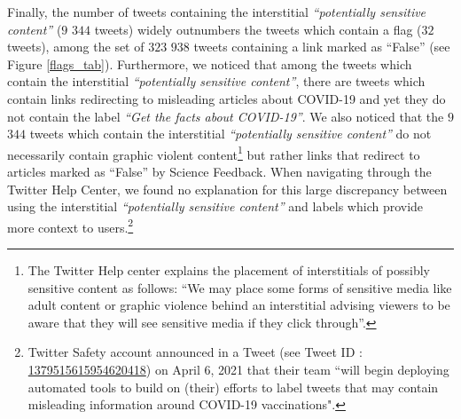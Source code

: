 \documentclass{article}
\begin{document}
Finally, the number of tweets containing the interstitial {\it ``potentially sensitive content''} ($9$ $344$ tweets) widely outnumbers the tweets which contain a flag ($32$ tweets), among the set of $323$ $938$ tweets containing a link marked as ``False'' (see Figure \ref{flags_tab}). Furthermore, we noticed that among the tweets which contain the interstitial {\it ``potentially sensitive content''}, there are tweets which contain links redirecting to misleading articles about COVID-19 and yet they do not contain the label { \it ``Get the facts about COVID-19''}. We also noticed that the $9$ $344$ tweets which contain the interstitial {\it ``potentially sensitive content''} do not necessarily contain graphic violent content\footnote{The Twitter Help center explains the placement of interstitials of possibly sensitive content as follows: ``We may place some forms of sensitive media like adult content or graphic violence behind an interstitial advising viewers to be aware that they will see sensitive media if they click through''.} but rather links that redirect to articles marked as ``False'' by Science Feedback. When navigating through the Twitter Help Center, we found no explanation for this large discrepancy between using the interstitial {\it ``potentially sensitive content''} and labels which provide more context to users.\footnote{Twitter Safety account announced in a Tweet (see Tweet ID : \href{https://twitter.com/TwitterSafety/status/1379515615954620418}{1379515615954620418}) on April 6, 2021 that their team ``will begin deploying automated tools to build on (their) efforts to label tweets that may contain misleading information around COVID-19 vaccinations".}  
\end{document}
